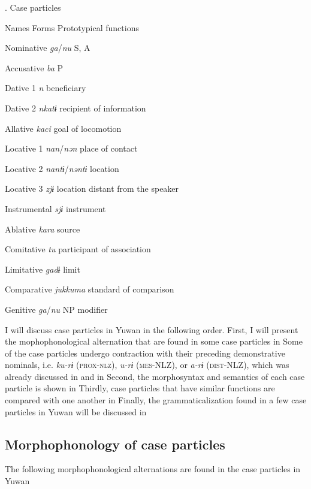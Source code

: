 \begin{table}
\caption{\label{tab:key:40}. Case particles}


Names  Forms  Prototypical functions

Nominative  \textit{ga}/\textit{nu}  S, A

Accusative  \textit{ba}  P

Dative 1  \textit{n}  beneficiary

Dative 2  \textit{nkatɨ}  recipient of information

Allative  \textit{kaci}  goal of locomotion

Locative 1  \textit{nan}/\textit{nən}  place of contact

Locative 2  \textit{nantɨ}/\textit{nəntɨ}  location

Locative 3  \textit{zjɨ}  location distant from the speaker

Instrumental  \textit{sjɨ}  instrument

Ablative  \textit{kara}  source

Comitative  \textit{tu}  participant of association

Limitative  \textit{gadɨ}  limit

Comparative  \textit{jukkuma}  standard of comparison

Genitive  \textit{ga}/\textit{nu}  NP modifier

I will discuss case particles in Yuwan in the following order. First, I will present the mophophonological alternation that are found in some case particles in  Some of the case particles undergo contraction with their preceding demonstrative nominals, i.e. \textit{ku-rɨ} (\textsc{prox}-\textsc{nlz}), \textit{u-rɨ} (\textsc{mes}-NLZ), or \textit{a-rɨ} (\textsc{dist}-NLZ), which was already discussed in  and  in  Second, the morphosyntax and semantics of each case particle is shown in  Thirdly, case particles that have similar functions are compared with one another in  Finally, the grammaticalization found in a few case particles in Yuwan will be discussed in 

\subsection{Morphophonology of case particles}

The following morphophonological alternations are found in the case particles in Yuwan


\end{table}

